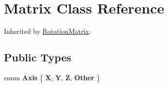 \hypertarget{class_matrix}{
\section{Matrix Class Reference}
\label{class_matrix}
}


Inherited by \hyperlink{class_rotation_matrix}{RotationMatrix}.

\subsection*{Public Types}
\begin{DoxyCompactItemize}
\item 
enum {\bfseries Axis} \{ {\bfseries X}, 
{\bfseries Y}, 
{\bfseries Z}, 
{\bfseries Other}
 \}
\end{DoxyCompactItemize}
